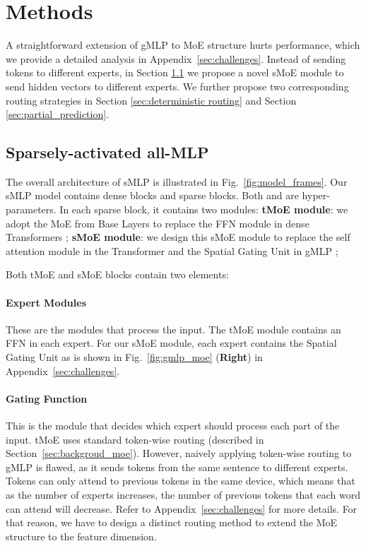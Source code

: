 \documentclass{article}
\begin{document}
 \section{Methods}
\label{sec:methods}

A straightforward extension of gMLP to MoE structure hurts performance, which we provide a detailed analysis in Appendix~\ref{sec:challenges}. Instead of sending tokens to different experts, in Section \ref{sec:sparse_mlp} we propose a novel sMoE module to send hidden vectors to different experts. We further propose two corresponding routing strategies in Section \ref{sec:deterministic routing} and Section \ref{sec:partial_prediction}. 







\subsection{Sparsely-activated all-MLP}
\label{sec:sparse_mlp}
 
The overall architecture of sMLP is illustrated in Fig.~\ref{fig:model_frames}. Our sMLP model contains  dense blocks and  sparse blocks. Both  and  are hyper-parameters. In each sparse block, it contains two modules: 
 \textbf{tMoE module}: we adopt the MoE from Base Layers \citep{baselayer} to replace the FFN module in dense Transformers \citep{vaswani2017attention}; 
 \textbf{sMoE module}: we design this sMoE module to replace the self attention module in the Transformer \citep{vaswani2017attention} and the Spatial Gating Unit in gMLP \citep{gmlp};

Both tMoE and sMoE blocks contain two elements: \paragraph{Expert Modules} These are the modules that process the input.
The tMoE module contains an FFN in each expert. For our sMoE module, each expert contains the Spatial Gating Unit as is shown in Fig.~\ref{fig:gmlp_moe} (\textbf{Right}) in Appendix~\ref{sec:challenges}. 

\paragraph{Gating Function}
This is the module that decides which expert should process each part of the input. tMoE uses standard token-wise routing (described in Section~\ref{sec:backgroud_moe}). However, naively applying token-wise routing to gMLP is flawed, as it sends tokens from the same sentence to different experts. Tokens can only attend to previous tokens in the same device, which means that as the number of experts increases, the number of previous tokens that each word can attend will decrease. Refer to Appendix~\ref{sec:challenges} for more details. For that reason, we have to design a distinct routing method to extend the MoE structure to the feature dimension. 
\end{document}

